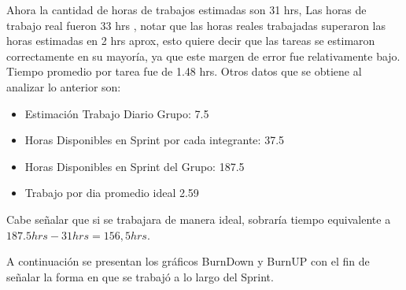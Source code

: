 \documentclass{memoria}
\begin{document}
Ahora la cantidad de horas de trabajos estimadas son 31 hrs, Las horas de trabajo real fueron 33 hrs , notar que las horas reales trabajadas superaron las horas estimadas en 2 hrs aprox, esto quiere decir que las tareas se estimaron correctamente en su mayoría, ya que este margen de error fue relativamente bajo. Tiempo promedio por tarea fue de 1.48 hrs. Otros datos que se obtiene al analizar lo anterior son:

\begin{itemize}
	\item Estimación Trabajo Diario Grupo: 7.5 
	\item Horas Disponibles en Sprint por cada integrante: 37.5 
	\item Horas Disponibles en Sprint del Grupo: 187.5 
	\item Trabajo por dia promedio ideal 2.59 
\end{itemize}

Cabe señalar que si se trabajara de manera ideal, sobraría  tiempo equivalente a $187.5hrs - 31hrs = 156,5hrs$. 

A continuación se presentan los gráficos BurnDown y BurnUP con el fin de señalar la forma en que se trabajó a lo largo del Sprint.


\newpage
{}
\end{document}
